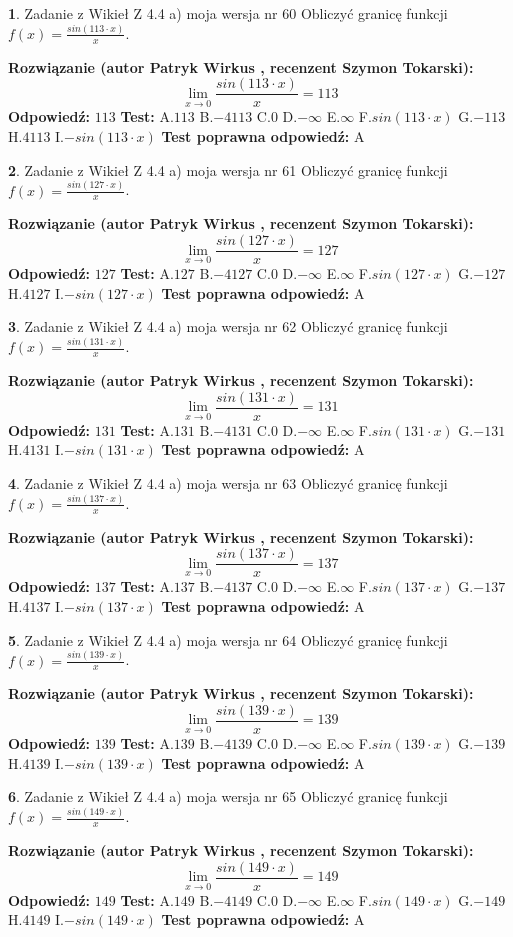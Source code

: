 \documentclass[12pt, a4paper]{article}
\theoremstyle{definition} %
\newtheorem{zad}{}
\newcommand{\zadStart}[1]{\begin{zad}#1\newline}
\newcommand{\zadStop}{\end{zad}}
\newcommand{\rozwStart}[2]{\noindent \textbf{Rozwiązanie (autor #1 , recenzent #2): }\newline}
\newcommand{\rozwStop}{\newline}
\newcommand{\odpStart}{\noindent \textbf{Odpowiedź:}\newline}
\newcommand{\odpStop}{\newline}
\newcommand{\testStart}{\noindent \textbf{Test:}\newline}
\newcommand{\testStop}{\newline}
\newcommand{\kluczStart}{\noindent \textbf{Test poprawna odpowiedź:}\newline}
\newcommand{\kluczStop}{\newline}
\begin{document}
\zadStart{Zadanie z Wikieł Z 4.4 a) moja wersja nr 60}
Obliczyć granicę funkcji $f(x)=\frac{sin(113\cdot x)}{x}$.
\zadStop
\rozwStart{Patryk Wirkus}{Szymon Tokarski}
$$\lim\limits_{x\to 0}\frac{sin(113\cdot x)}{x}=
113$$
\rozwStop
\odpStart
$113$
\odpStop
\testStart
A.$113$
B.$-4113$
C.$0$
D.$-\infty$
E.$\infty$
F.$sin(113\cdot x)$
G.$-113$
H.$4113$
I.$-sin(113\cdot x)$
\testStop
\kluczStart
A
\kluczStop



\zadStart{Zadanie z Wikieł Z 4.4 a) moja wersja nr 61}
Obliczyć granicę funkcji $f(x)=\frac{sin(127\cdot x)}{x}$.
\zadStop
\rozwStart{Patryk Wirkus}{Szymon Tokarski}
$$\lim\limits_{x\to 0}\frac{sin(127\cdot x)}{x}=
127$$
\rozwStop
\odpStart
$127$
\odpStop
\testStart
A.$127$
B.$-4127$
C.$0$
D.$-\infty$
E.$\infty$
F.$sin(127\cdot x)$
G.$-127$
H.$4127$
I.$-sin(127\cdot x)$
\testStop
\kluczStart
A
\kluczStop



\zadStart{Zadanie z Wikieł Z 4.4 a) moja wersja nr 62}
Obliczyć granicę funkcji $f(x)=\frac{sin(131\cdot x)}{x}$.
\zadStop
\rozwStart{Patryk Wirkus}{Szymon Tokarski}
$$\lim\limits_{x\to 0}\frac{sin(131\cdot x)}{x}=
131$$
\rozwStop
\odpStart
$131$
\odpStop
\testStart
A.$131$
B.$-4131$
C.$0$
D.$-\infty$
E.$\infty$
F.$sin(131\cdot x)$
G.$-131$
H.$4131$
I.$-sin(131\cdot x)$
\testStop
\kluczStart
A
\kluczStop



\zadStart{Zadanie z Wikieł Z 4.4 a) moja wersja nr 63}
Obliczyć granicę funkcji $f(x)=\frac{sin(137\cdot x)}{x}$.
\zadStop
\rozwStart{Patryk Wirkus}{Szymon Tokarski}
$$\lim\limits_{x\to 0}\frac{sin(137\cdot x)}{x}=
137$$
\rozwStop
\odpStart
$137$
\odpStop
\testStart
A.$137$
B.$-4137$
C.$0$
D.$-\infty$
E.$\infty$
F.$sin(137\cdot x)$
G.$-137$
H.$4137$
I.$-sin(137\cdot x)$
\testStop
\kluczStart
A
\kluczStop



\zadStart{Zadanie z Wikieł Z 4.4 a) moja wersja nr 64}
Obliczyć granicę funkcji $f(x)=\frac{sin(139\cdot x)}{x}$.
\zadStop
\rozwStart{Patryk Wirkus}{Szymon Tokarski}
$$\lim\limits_{x\to 0}\frac{sin(139\cdot x)}{x}=
139$$
\rozwStop
\odpStart
$139$
\odpStop
\testStart
A.$139$
B.$-4139$
C.$0$
D.$-\infty$
E.$\infty$
F.$sin(139\cdot x)$
G.$-139$
H.$4139$
I.$-sin(139\cdot x)$
\testStop
\kluczStart
A
\kluczStop



\zadStart{Zadanie z Wikieł Z 4.4 a) moja wersja nr 65}
Obliczyć granicę funkcji $f(x)=\frac{sin(149\cdot x)}{x}$.
\zadStop
\rozwStart{Patryk Wirkus}{Szymon Tokarski}
$$\lim\limits_{x\to 0}\frac{sin(149\cdot x)}{x}=
149$$
\rozwStop
\odpStart
$149$
\odpStop
\testStart
A.$149$
B.$-4149$
C.$0$
D.$-\infty$
E.$\infty$
F.$sin(149\cdot x)$
G.$-149$
H.$4149$
I.$-sin(149\cdot x)$
\testStop
\kluczStart
A
\kluczStop
\end{document}
